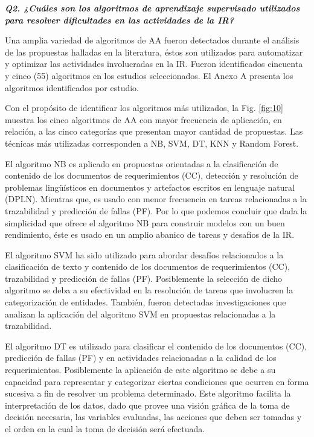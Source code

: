 \documentclass[journal]{IEEEtran}
\begin{document}
\emph{\textbf{Q2. ¿Cuáles son los algoritmos de aprendizaje supervisado utilizados para resolver dificultades en las actividades de la IR?}}

Una amplia variedad de algoritmos de AA fueron detectados durante el análisis de las propuestas halladas en la literatura, éstos son utilizados para automatizar y optimizar las actividades involucradas en la IR. Fueron identificados cincuenta y cinco (55) algoritmos en los estudios seleccionados. El Anexo A presenta los algoritmos identificados por estudio.

Con el propósito de identificar los algoritmos más utilizados, la Fig. \ref{fig:10} muestra los cinco algoritmos de AA con mayor frecuencia de aplicación, en relación, a las cinco categorías que presentan mayor cantidad de propuestas. Las técnicas más utilizadas corresponden a NB, SVM, DT, KNN y Random Forest.

El algoritmo NB es aplicado en propuestas orientadas a la clasificación de contenido de los documentos de requerimientos (CC), detección y resolución de problemas lingüísticos en documentos y artefactos escritos en lenguaje natural (DPLN). Mientras que, es usado con menor frecuencia en tareas relacionadas a la trazabilidad y predicción de fallas (PF). 
Por lo que podemos concluir que dada la simplicidad que ofrece el algoritmo NB para construir modelos con un buen rendimiento, éste es usado en un amplio abanico de tareas y desafíos de la IR. 

El algoritmo SVM ha sido utilizado para abordar desafíos relacionados a la clasificación de texto y contenido de los documentos de requerimientos (CC), trazabilidad y predicción de fallas (PF). Posiblemente la selección de dicho algoritmo se deba a su efectividad en la resolución de tareas que involucren la categorización de entidades. También, fueron detectadas investigaciones que analizan la aplicación del algoritmo SVM en propuestas relacionadas a la trazabilidad. 

El algoritmo DT es utilizado para clasificar el contenido de los documentos (CC), predicción de fallas (PF) y en actividades relacionadas a la calidad de los requerimientos. Posiblemente la aplicación de este algoritmo se debe a su capacidad para representar y categorizar ciertas condiciones que ocurren en forma sucesiva a fin de resolver un problema determinado. Este algoritmo facilita la interpretación de los datos, dado que provee una visión gráfica de la toma de decisión necesaria, las variables evaluadas, las acciones que deben ser tomadas y el orden en la cual la toma de decisión será efectuada. 
\end{document}
